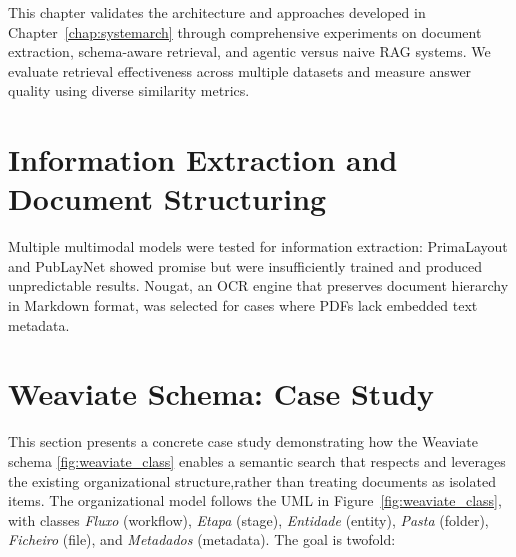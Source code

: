 \label{chap:results}

This chapter validates the architecture and approaches developed in Chapter~\ref{chap:systemarch} through comprehensive experiments on document extraction, schema-aware retrieval, and agentic versus naive \gls{RAG} systems. We evaluate retrieval effectiveness across multiple datasets and measure answer quality using diverse similarity metrics.

\section{Information Extraction and Document Structuring}

Multiple multimodal models were tested for information extraction: PrimaLayout and PubLayNet showed promise but were insufficiently trained and produced unpredictable results. Nougat, an OCR engine that preserves document hierarchy in Markdown format, was selected for cases where PDFs lack embedded text metadata.
\section{Weaviate Schema: Case Study}
\label{sec:schema_example_study}

This section presents a concrete case study demonstrating how the Weaviate schema \ref{fig:weaviate_class} enables a semantic search that respects and leverages the existing organizational structure,rather than treating documents as isolated items. The organizational model follows the UML in Figure~\ref{fig:weaviate_class}, with classes \textit{Fluxo} (workflow), \textit{Etapa} (stage), \textit{Entidade} (entity), \textit{Pasta} (folder), \textit{Ficheiro} (file), and \textit{Metadados} (metadata). The goal is twofold:

